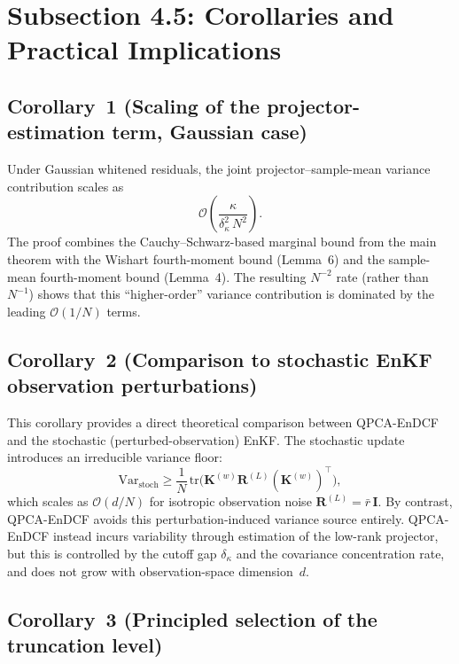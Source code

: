 \documentclass[11pt]{article}
\begin{document}
\section*{Subsection 4.5: Corollaries and Practical Implications}

\subsection*{Corollary~1 (Scaling of the projector-estimation term, Gaussian case)}

Under Gaussian whitened residuals, the joint projector--sample-mean variance
contribution scales as
\[
  \mathcal{O}\!\left(\frac{\kappa}{\delta_\kappa^2 \, N^2}\right).
\]
The proof combines the Cauchy--Schwarz-based marginal bound from the main
theorem with the Wishart fourth-moment bound (Lemma~6) and the sample-mean
fourth-moment bound (Lemma~4). The resulting $N^{-2}$ rate (rather than
$N^{-1}$) shows that this ``higher-order'' variance contribution is dominated
by the leading $\mathcal{O}(1/N)$ terms.

\subsection*{Corollary~2 (Comparison to stochastic EnKF observation perturbations)}

This corollary provides a direct theoretical comparison between QPCA-EnDCF and
the stochastic (perturbed-observation) EnKF. The stochastic update introduces
an irreducible variance floor:
\[
  \mathrm{Var}_{\mathrm{stoch}}
  \ge
  \frac{1}{N}\,
  \mathrm{tr}\!\bigl(\mathbf{K}^{(w)}\mathbf{R}^{(L)}(\mathbf{K}^{(w)})^\top\bigr),
\]
which scales as $\mathcal{O}(d/N)$ for isotropic observation noise
$\mathbf{R}^{(L)} = \bar{r}\,\mathbf{I}$. By contrast, QPCA-EnDCF avoids this
perturbation-induced variance source entirely. QPCA-EnDCF instead incurs
variability through estimation of the low-rank projector, but this is controlled
by the cutoff gap $\delta_\kappa$ and the covariance concentration rate, and
does not grow with observation-space dimension~$d$.

\subsection*{Corollary~3 (Principled selection of the truncation level)}
\end{document}
